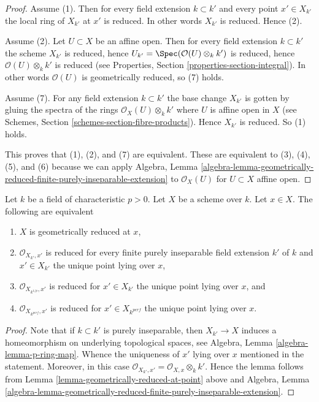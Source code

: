 \begin{proof}
Assume (1). Then for every field extension $k \subset k'$ and
every point $x' \in X_{k'}$ the local ring of $X_{k'}$ at $x'$
is reduced. In other words $X_{k'}$ is reduced. Hence (2).

\medskip\noindent
Assume (2). Let $U \subset X$ be an affine open. Then for
every field extension $k \subset k'$ the scheme $X_{k'}$ is reduced, hence
$U_{k'} = \Spec(\mathcal{O}(U)\otimes_k k')$ is reduced,
hence $\mathcal{O}(U)\otimes_k k'$ is reduced (see Properties,
Section \ref{properties-section-integral}). In other words
$\mathcal{O}(U)$ is geometrically reduced, so (7) holds.

\medskip\noindent
Assume (7). For any field extension $k \subset k'$ the base
change $X_{k'}$ is gotten by gluing the spectra of the
rings $\mathcal{O}_X(U) \otimes_k k'$ where $U$ is affine open
in $X$ (see Schemes, Section \ref{schemes-section-fibre-products}).
Hence $X_{k'}$ is reduced. So (1) holds.

\medskip\noindent
This proves that (1), (2), and (7) are equivalent. These are equivalent
to (3), (4), (5), and (6) because we can apply Algebra, Lemma
\ref{algebra-lemma-geometrically-reduced-finite-purely-inseparable-extension}
to $\mathcal{O}_X(U)$ for $U \subset X$ affine open.
\end{proof}

\begin{lemma}
\label{lemma-check-only-finite-inseparable-extensions}
Let $k$ be a field of characteristic $p > 0$. Let $X$ be a scheme over $k$.
Let $x \in X$. The following are equivalent
\begin{enumerate}
\item $X$ is geometrically reduced at $x$,
\item $\mathcal{O}_{X_{k'}, x'}$ is reduced for every
finite purely inseparable field extension $k'$ of $k$ and
$x' \in X_{k'}$ the unique point lying over $x$,
\item $\mathcal{O}_{X_{k^{1/p}}, x'}$ is reduced for
$x' \in X_{k'}$ the unique point lying over $x$, and
\item $\mathcal{O}_{X_{k^{perf}}, x'}$ is reduced for
$x' \in X_{k^{perf}}$ the unique point lying over $x$.
\end{enumerate}
\end{lemma}

\begin{proof}
Note that if $k \subset k'$ is purely inseparable, then
$X_{k'} \to X$ induces a homeomorphism on underlying topological
spaces, see Algebra, Lemma \ref{algebra-lemma-p-ring-map}.
Whence the uniqueness of $x'$ lying over $x$ mentioned in the
statement. Moreover, in this case
$\mathcal{O}_{X_{k'}, x'} = \mathcal{O}_{X, x} \otimes_k k'$.
Hence the lemma follows from Lemma \ref{lemma-geometrically-reduced-at-point}
above and Algebra, Lemma
\ref{algebra-lemma-geometrically-reduced-finite-purely-inseparable-extension}.
\end{proof}

